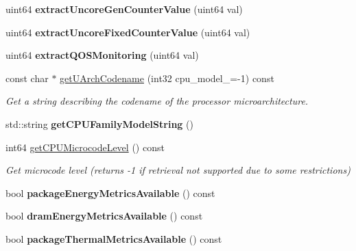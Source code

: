 \begin{DoxyCompactItemize}
uint64 {\bfseries extract\+Uncore\+Gen\+Counter\+Value} (uint64 val)
\item 
\mbox{\label{class_p_c_m_a8ea22c144bd0a0a2c2672b49b0ad5a5b}} 
uint64 {\bfseries extract\+Uncore\+Fixed\+Counter\+Value} (uint64 val)
\item 
\mbox{\label{class_p_c_m_ab42f103a8df6035c075f022d6c7de04d}} 
uint64 {\bfseries extract\+Q\+O\+S\+Monitoring} (uint64 val)
\item 
const char $\ast$ \mbox{\hyperlink{class_p_c_m_a4c6bf89a6b0ab826a251a231ff1602ad}{get\+U\+Arch\+Codename}} (int32 cpu\+\_\+model\+\_\+=-\/1) const
\begin{DoxyCompactList}\small\item\em Get a string describing the codename of the processor microarchitecture. \end{DoxyCompactList}\item 
\mbox{\label{class_p_c_m_aa593d2445c7c96ebcb2e37222c2d8ff4}} 
std\+::string {\bfseries get\+C\+P\+U\+Family\+Model\+String} ()
\item 
\mbox{\label{class_p_c_m_a7e6e4c165db2cfaabaf8f5758a29ae40}} 
int64 \mbox{\hyperlink{class_p_c_m_a7e6e4c165db2cfaabaf8f5758a29ae40}{get\+C\+P\+U\+Microcode\+Level}} () const
\begin{DoxyCompactList}\small\item\em Get microcode level (returns -\/1 if retrieval not supported due to some restrictions) \end{DoxyCompactList}\item 
\mbox{\label{class_p_c_m_a12b0f8e35174cd37da0f3b9200faf978}} 
bool {\bfseries package\+Energy\+Metrics\+Available} () const
\item 
\mbox{\label{class_p_c_m_a2202ca6339cf5df064bd94f22036e92a}} 
bool {\bfseries dram\+Energy\+Metrics\+Available} () const
\item 
\mbox{\label{class_p_c_m_aaa584d7a737db19e0ee032eae012d1dd}} 
bool {\bfseries package\+Thermal\+Metrics\+Available} () const
\item 
\mbox{\label{class_p_c_m_a004d5ea964102d4c3522e1be0b0f28ff}} 

\end{DoxyCompactItemize}
